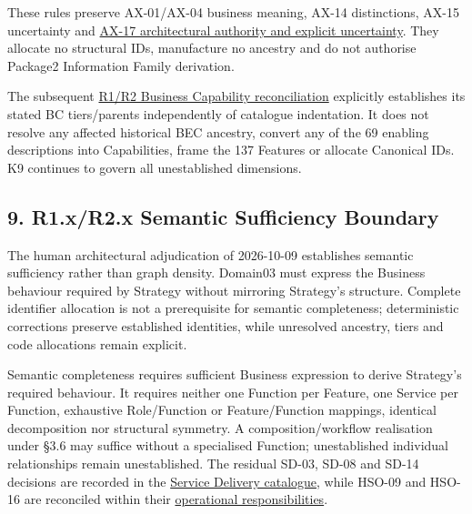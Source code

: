 \label{rad:metamodel:447}

These rules preserve AX-01/\allowbreak{}AX-04 business meaning, AX-14 distinctions, AX-15 uncertainty and \href{https://github.com/fhirfactory/harmonia/blob/98410db60155198a75f74c79d98060070209faa1/docs/markdown/governance/architectural-axioms.md\#ax-17}{AX-17 architectural authority and explicit uncertainty}. They allocate no structural IDs, manufacture no ancestry and do not authorise Package2 Information Family derivation.

\label{rad:metamodel:449}

The subsequent \hyperref[rad:business]{R1/\allowbreak{}R2 Business Capability reconciliation} explicitly establishes its stated BC tiers/\allowbreak{}parents independently of catalogue indentation. It does not resolve any affected historical BEC ancestry, convert any of the 69 enabling descriptions into Capabilities, frame the 137 Features or allocate Canonical IDs. K9 continues to govern all unestablished dimensions.

\label{rad:metamodel:451}
\subsection*{9. R1.x/\allowbreak{}R2.x Semantic Sufficiency Boundary}
\label{rad:metamodel:453}

The human architectural adjudication of 2026-10-09 establishes semantic sufficiency rather than graph density. Domain03 must express the Business behaviour required by Strategy without mirroring Strategy's structure. Complete identifier allocation is not a prerequisite for semantic completeness; deterministic corrections preserve established identities, while unresolved ancestry, tiers and code allocations remain explicit.

\label{rad:metamodel:455}

Semantic completeness requires sufficient Business expression to derive Strategy's required behaviour. It requires neither one Function per Feature, one Service per Function, exhaustive Role/\allowbreak{}Function or Feature/\allowbreak{}Function mappings, identical decomposition nor structural symmetry. A composition/\allowbreak{}workflow realisation under §3.6 may suffice without a specialised Function; unestablished individual relationships remain unestablished. The residual SD-03, SD-08 and SD-14 decisions are recorded in the \hyperref[rad:sd:16]{Service Delivery catalogue}, while HSO-09 and HSO-16 are reconciled within their \hyperref[rad:hso]{operational responsibilities}.

